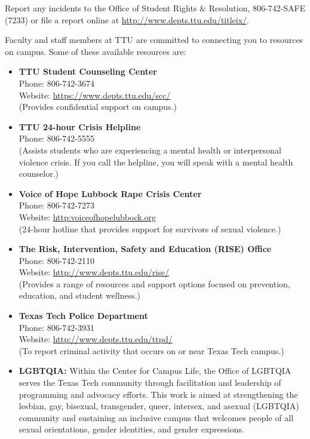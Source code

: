 \documentclass[11pt]{NSF}
\def\bi{\begin{itemize}}
\def\ei{\end{itemize}}
\def\i{\item{}}
\begin{document}
Report any
incidents to the Office of Student Rights \& Resolution, 806-742-SAFE
(7233) or file a report online at 
\url{http://www.depts.ttu.edu/titleix/}. 

Faculty and staff
members at TTU are committed to connecting you to resources on campus.
Some of these available resources are: 

\bi
\i {\bf TTU Student Counseling Center}\\
Phone: 806-742-3674\\
Website: \url{https://www.depts.ttu.edu/scc/}\\
(Provides confidential support on campus.) 

\i {\bf TTU 24-hour Crisis Helpline}\\
Phone: 806-742-5555\\
(Assists students who are experiencing a mental health or
interpersonal violence crisis. If you call the helpline, you will
speak with a mental health counselor.) 

\i {\bf Voice of Hope Lubbock Rape Crisis Center}\\
Phone: 806-742-7273\\
Website: \url{http:voiceofhopelubbock.org}\\
(24-hour hotline
that provides support for survivors of sexual violence.) 

\i {\bf The Risk, Intervention, Safety and Education (RISE) Office}\\
Phone: 806-742-2110\\
Website: \url{http://www.depts.ttu.edu/rise/}\\
(Provides a range of resources and support options
focused on prevention, education, and student wellness.) 

\i {\bf Texas Tech Police Department}\\
Phone: 806-742-3931\\ 
Website: \url{http://www.depts.ttu.edu/ttpd/}\\ 
(To report criminal activity that occurs on or near Texas Tech campus.)

\i {\bf LGBTQIA:}
Within the Center for Campus Life, the Office of LGBTQIA
serves the Texas Tech community through facilitation and leadership of
programming and advocacy efforts. This work is aimed at strengthening
the lesbian, gay, bisexual, transgender, queer, intersex, and asexual
(LGBTQIA) community and sustaining an inclusive campus that welcomes
people of all sexual orientations, gender identities, and gender
expressions.

\ei
\end{document}
